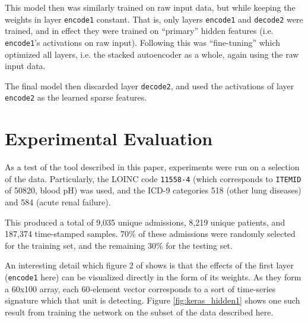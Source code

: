 \documentclass[journal]{IEEEtran}
\begin{document}
This model then was similarly trained on raw input data, but while
keeping the weights in layer \texttt{encode1} constant.  That is, only
layers \texttt{encode1} and \texttt{decode2} were trained, and in
effect they were trained on ``primary'' hidden features
(i.e. \texttt{encode1}'s activations on raw input).  Following this
was ``fine-tuning''\cite{Ng} which optimized all layers, i.e. the
stacked autoencoder as a whole, again using the raw input data.

The final model then discarded layer \texttt{decode2}, and used the
activations of layer \texttt{encode2} as the learned sparse features.




\section{Experimental Evaluation}

As a test of the tool described in this paper, experiments were run on
a selection of the data.  Particularly, the LOINC code
\texttt{11558-4} (which corresponds to \texttt{ITEMID} of 50820, blood
pH) was used, and the ICD-9 categories 518 (other lung diseases) and
584 (acute renal failure).

This produced a total of 9,035 unique admissions, 8,219 unique
patients, and 187,374 time-stamped samples.  70\% of these admissions
were randomly selected for the training set, and the remaining 30\%
for the testing set.



An interesting detail which figure 2 of \cite{Lasko2013} shows is that
the effects of the first layer (\texttt{encode1} here) can be
visualized directly in the form of its weights.  As they form a 60x100
array, each 60-element vector corresponds to a sort of time-series
signature which that unit is detecting.  Figure
\ref{fig:keras_hidden1} shows one such result from training the
network on the subset of the data described here.
\end{document}
